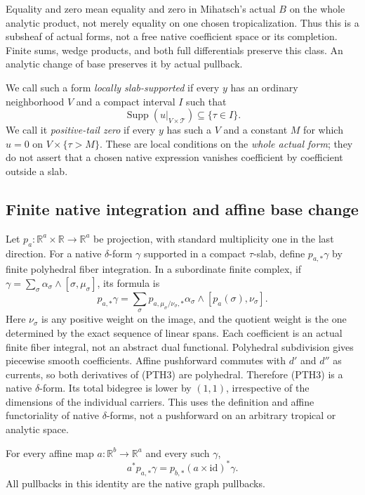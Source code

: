 Equality and zero mean equality and zero in Mihatsch's actual
$B$ on the whole analytic product, not merely equality on one
chosen tropicalization.  Thus this is a subsheaf of actual forms,
not a free native coefficient space or its completion.  Finite sums,
wedge products, and both full differentials preserve this class.
An analytic change of base preserves it by actual pullback.

We call such a form \emph{locally slab-supported} if every $y$ has
an ordinary neighborhood $V$ and a compact interval $I$ such that
\[
                 \operatorname{Supp}(u|_{V\times\mathcal T})
                        \subseteq\{\tau\in I\}.
 \tag{PTH2}
\]
We call it \emph{positive-tail zero} if every $y$ has such a $V$
and a constant $M$ for which $u=0$ on $V\times\{\tau>M\}$.
These are local conditions on the \emph{whole actual form}; they
do not assert that a chosen native expression vanishes coefficient
by coefficient outside a slab.

\subsection{Finite native integration and affine base change}

Let $p_a:\mathbb R^a\times\mathbb R\to\mathbb R^a$ be projection,
with standard multiplicity one in the last direction.  For a native
$\delta$-form $\gamma$ supported in a compact $\tau$-slab, define
$p_{a,*}\gamma$ by finite polyhedral fiber integration.  In a
subordinate finite complex, if
$\gamma=\sum_\sigma\alpha_\sigma\wedge[\sigma,\mu_\sigma]$,
its formula is
\[
 p_{a,*}\gamma=
 \sum_\sigma
 p_{a,\mu_\sigma/\nu_\sigma,*}\alpha_\sigma
                  \wedge[p_a(\sigma),\nu_\sigma].
 \tag{PTH3}
\]
Here $\nu_\sigma$ is any positive weight on the image, and the
quotient weight is the one determined by the exact sequence of
linear spans.  Each coefficient is an actual finite fiber integral,
not an abstract dual functional.  Polyhedral subdivision gives
piecewise smooth coefficients.  Affine pushforward commutes with
$d'$ and $d''$ as currents, so both derivatives of (PTH3) are
polyhedral.  Therefore (PTH3) is a native $\delta$-form.  Its total
bidegree is lower by $(1,1)$, irrespective of the dimensions of
the individual carriers.  This uses the definition and affine
functoriality of native $\delta$-forms, not a pushforward on an
arbitrary tropical or analytic space.

\begin{lemma}
For every affine map $a:\mathbb R^b\to\mathbb R^a$ and every
such $\gamma$,
\[
 a^*p_{a,*}\gamma
       =p_{b,*}(a\times\mathrm{id})^*\gamma.
 \tag{PTH4}
\]
All pullbacks in this identity are the native graph pullbacks.
\end{lemma}

